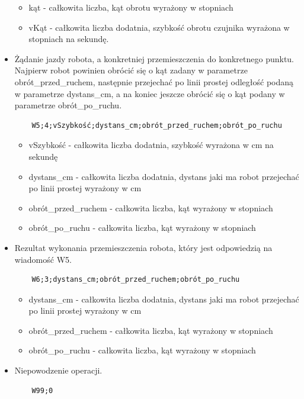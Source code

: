 \documentclass[a4paper]{article}
\begin{document}
\begin{itemize}
\begin{itemize}
	\item kąt - całkowita liczba, kąt obrotu wyrażony w stopniach
	\item vKąt - całkowita liczba dodatnia, szybkość obrotu czujnika wyrażona w stopniach na sekundę.
	\end{itemize}
\item Żądanie jazdy robota, a konkretniej przemieszczenia do konkretnego punktu. Najpierw robot powinien obrócić się o kąt zadany w parametrze obrót\_przed\_ruchem, następnie przejechać po linii prostej odległość podaną w parametrze dystans\_cm, a na koniec jeszcze obrócić się o kąt podany w parametrze obrót\_po\_ruchu. 
\begin{verbatim}
	W5;4;vSzybkość;dystans_cm;obrót_przed_ruchem;obrót_po_ruchu
\end{verbatim}
	\begin{itemize}
	\item vSzybkość - całkowita liczba dodatnia, szybkość wyrażona w cm na sekundę
	\item dystans\_cm - całkowita liczba dodatnia, dystans jaki ma robot przejechać po linii prostej wyrażony w cm
	\item obrót\_przed\_ruchem - całkowita liczba, kąt wyrażony w stopniach
	\item obrót\_po\_ruchu - całkowita liczba, kąt wyrażony w stopniach
	\end{itemize}
\item Rezultat wykonania przemieszczenia robota, który jest odpowiedzią na wiadomość W5.  
\begin{verbatim}
	W6;3;dystans_cm;obrót_przed_ruchem;obrót_po_ruchu
\end{verbatim}
	\begin{itemize}
	\item dystans\_cm - całkowita liczba dodatnia, dystans jaki ma robot przejechać po linii prostej wyrażony w cm
	\item obrót\_przed\_ruchem - całkowita liczba, kąt wyrażony w stopniach
	\item obrót\_po\_ruchu - całkowita liczba, kąt wyrażony w stopniach
	\end{itemize}
\item Niepowodzenie operacji.
\begin{verbatim}
	W99;0
\end{verbatim}
\end{itemize}
\end{document}
